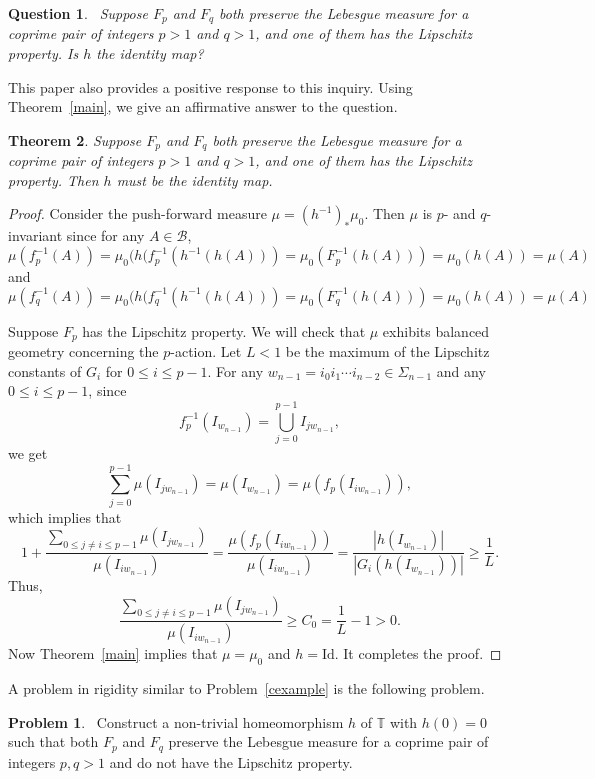 \documentclass[11pt]{amsart}
\newtheorem{theorem}{Theorem}
\newtheorem{question}[theorem]{Question}
\theoremstyle{definition}
\newtheorem{problem}{Problem}
\begin{document}
\medskip
\begin{question}~\label{q}
Suppose $F_{p}$ and $F_{q}$ both preserve the Lebesgue measure for a coprime pair of integers $p>1$ and $q>1$, and one of them has the Lipschitz property. Is $h$ the identity map? 
\end{question}

This paper also provides a positive response to this inquiry.
Using Theorem~\ref{main}, we give an affirmative answer to the question.

\medskip
\begin{theorem}\label{main2}
Suppose $F_{p}$ and $F_{q}$ both preserve the Lebesgue measure for a coprime pair of integers $p>1$ and $q>1$, and one of them has the Lipschitz property. Then $h$ must be the identity map.
\end{theorem}

\begin{proof}
Consider the push-forward measure $\mu=(h^{-1})_{*} \mu_{0}$. Then $\mu$ is $p$- and $q$-invariant since for any $A\in \mathcal{B}$,
\[
\mu (f_{p}^{-1}(A)) = \mu_{0} (h (f_{p}^{-1} (h^{-1} (h(A)))=\mu_{0}(F_{p}^{-1} (h(A))) =\mu_{0} (h(A)) =\mu (A)
\]
and 
\[
\mu (f_{q}^{-1}(A)) = \mu_{0} (h (f_{q}^{-1} (h^{-1} (h(A)))=\mu_{0}(F_{q}^{-1} (h(A))) =\mu_{0} (h(A)) =\mu (A)
\]

Suppose $F_{p}$ has the Lipschitz property. We will check that $\mu$ exhibits balanced geometry concerning the $p$-action. Let $L<1$ be the maximum of the Lipschitz constants of $G_{i}$ for $0\leq i\leq p-1$. 
For any $w_{n-1}=i_{0}i_{1}\cdots i_{n-2}\in \Sigma_{n-1}$ and any $0\leq i\leq p-1$, since  
\[
f^{-1}_{p}(I_{w_{n-1}})=\bigcup_{j=0}^{p-1} I_{jw_{n-1}},
\]
we get 
\[
\sum_{j=0}^{p-1} \mu (I_{jw_{n-1}}) = \mu (I_{w_{n-1}}) =\mu (f_{p}(I_{iw_{n-1}})),
\]
which implies that
\[
1+  \frac{\sum_{0\leq j\not=i\leq p-1} \mu (I_{j w_{n-1}})}{\mu(I_{iw_{n-1}})}=\frac{\mu (f_{p}(I_{iw_{n-1}}))}{\mu(I_{iw_{n-1}})}=
\frac{|h(I_{w_{n-1}})|}{|G_{i}(h(I_{w_{n-1}}))|} \geq \frac{1}{L}.
\]
Thus,
\[
\frac{\sum_{0\leq j\not=i\leq p-1} \mu (I_{j w_{n-1}})}{\mu(I_{iw_{n-1}})}\geq C_{0}=\frac{1}{L}-1>0.
\]
 Now Theorem~\ref{main} implies that $\mu=\mu_{0}$ and $h=\text{Id}$. It completes the proof.
\end{proof}

A problem in rigidity similar to Problem~\ref{cexample} is the following problem.

\medskip
\begin{problem}~\label{p}
Construct a non-trivial homeomorphism $h$ of $\mathbb{T}$ with $h(0)=0$ such that both $F_{p}$ and $F_{q}$ preserve the Lebesgue measure for a coprime pair of integers $p, q>1$ and do not have the Lipschitz property. 
\end{problem} 
 
\end{document}
